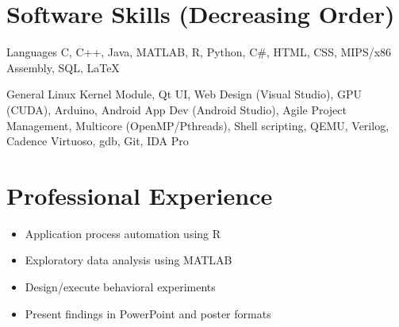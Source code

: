 \documentclass{tccv_AH}
\begin{document}
\vspace{-1.75em}
\section{Software Skills \footnotesize{(Decreasing Order)}}

\begin{factlist}

\item{Languages}
     {C, C++, Java, MATLAB, R, Python, C\#, HTML, CSS, MIPS/x86 Assembly, SQL, \LaTeX}

\item{General}
     {Linux Kernel Module, Qt UI, Web Design (Visual Studio), GPU (CUDA), Arduino, Android App Dev (Android Studio), 
     Agile Project Management, Multicore (OpenMP/Pthreads), Shell scripting, QEMU, Verilog, Cadence Virtuoso, gdb, Git, IDA Pro}

\end{factlist}


\vspace{-1.5em}
\section{Professional Experience}

\vspace{-.5em}
\begin{itemize}
    \itemsep-0.25em
    \item{Application process automation using R}
\end{itemize}

\medskip


\medskip

\vspace{-.5em}
\begin{itemize}
    \itemsep-0.25em
    \item{Exploratory data analysis using MATLAB}
    \item{Design/execute behavioral experiments}
    \item{Present findings in PowerPoint and poster formats}
\end{itemize}
\end{document}
